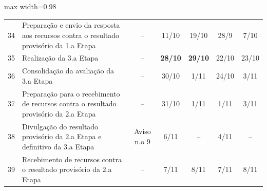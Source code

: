 \begin{landscape}
\begin{quadro}[htb]
\begin{adjustbox}{max width=0.98\linewidth}
\begin{tabular}{|c|l|c|c|c|c|c|}
34 & Preparação e envio da   resposta aos recursos contra o resultado provisório da 1.a Etapa                                                   & –                   & 11/10                                                                           & 19/10                                 & 28/9                                                                            & 7/10                 \\
\rowcolor[HTML]{FCD5B4} 
35 & Realização da 3.a   Etapa                                                                                                                  & –                   & {\color[HTML]{FF0000} \textbf{28/10}}                                           & {\color[HTML]{FF0000} \textbf{29/10}} & 22/10                                                                           & 23/10                \\
36 & Consolidação da   avaliação da 3.a Etapa                                                                                                   & –                   & 30/10                                                                           & 1/11                                  & 24/10                                                                           & 3/11                 \\
37 & Preparação para o   recebimento de recursos contra o resultado provisório da 2.a Etapa                                                     & –                   & 31/10                                                                           & 1/11                                  & 1/11                                                                            & 3/11                 \\
\rowcolor[HTML]{92CDDC} 
38 & Divulgação do   resultado provisório da 2.a Etapa e definitivo da 3.a Etapa                                                                & Aviso n.o 9         & 6/11                                                                            & –                                     & 4/11                                                                            & –                    \\
39 & Recebimento de   recursos contra o resultado provisório da 2.a Etapa                                                                       & –                   & 7/11                                                                            & 8/11                                  & 7/11                                                                            & 8/11                 \\

\end{tabular}
\end{adjustbox}
\end{quadro}
\end{landscape}
